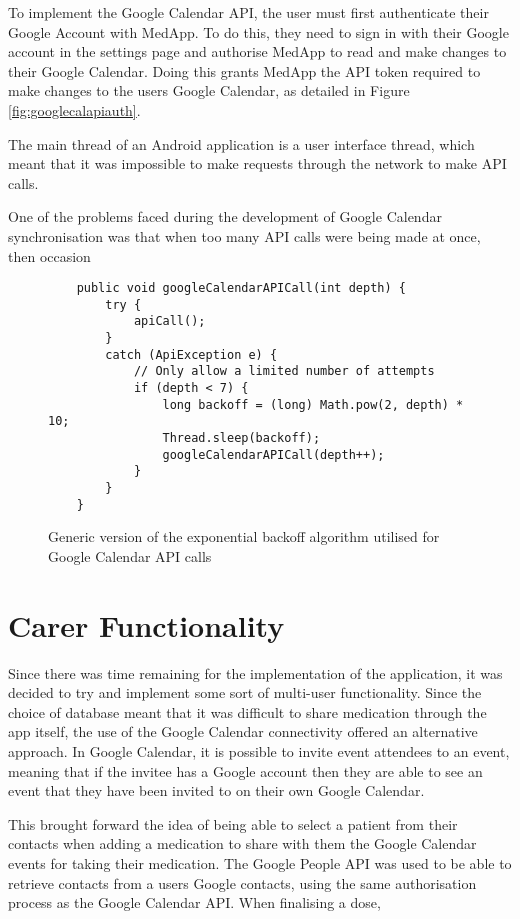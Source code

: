 \documentclass{l4proj}
\begin{document}
To implement the Google Calendar API, the user must first authenticate their Google Account with MedApp. To do this, they need to sign in with their Google account in the settings page and authorise MedApp to read and make changes to their Google Calendar. Doing this grants MedApp the API token required to make changes to the users Google Calendar, as detailed in Figure \ref{fig:googlecalapiauth}.

The main thread of an Android application is a user interface thread, which meant that it was impossible to make requests through the network to make API calls. 

One of the problems faced during the development of Google Calendar synchronisation was that when too many API calls were being made at once, then occasion

\lstset{language=Java}
\begin{figure}[!ht]
    \centering
    \begin{lstlisting}
    public void googleCalendarAPICall(int depth) {
        try {
            apiCall();
        }
        catch (ApiException e) {
            // Only allow a limited number of attempts
            if (depth < 7) { 
                long backoff = (long) Math.pow(2, depth) * 10; 
                Thread.sleep(backoff);
                googleCalendarAPICall(depth++);
            }
        }
    }
\end{lstlisting}
    \caption{Generic version of the exponential backoff algorithm utilised for Google Calendar API calls}
    \label{fig:exponential_backoff}
\end{figure}

\section{Carer Functionality}

Since there was time remaining for the implementation of the application, it was decided to try and implement some sort of multi-user functionality. Since the choice of database meant that it was difficult to share medication through the app itself, the use of the Google Calendar connectivity offered an alternative approach. In Google Calendar, it is possible to invite event attendees to an event, meaning that if the invitee has a Google account then they are able to see an event that they have been invited to on their own Google Calendar. 

This brought forward the idea of being able to select a patient from their contacts when adding a medication to share with them the Google Calendar events for taking their medication. The Google People API was used to be able to retrieve contacts from a users Google contacts, using the same authorisation process as the Google Calendar API. When finalising a dose, 
\end{document}

